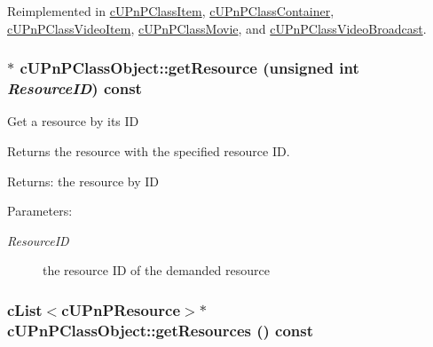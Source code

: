 Reimplemented in \hyperlink{classcUPnPClassItem_add0c9d378036e270e6f99d8d1409e3b}{cUPnPClassItem}, \hyperlink{classcUPnPClassContainer_d952c993314a9352d13f644bb95fbdc2}{cUPnPClassContainer}, \hyperlink{classcUPnPClassVideoItem_9dc397419b45535a3e6a676667b619a4}{cUPnPClassVideoItem}, \hyperlink{classcUPnPClassMovie_b62e6dac175090b82c47f955e29c146c}{cUPnPClassMovie}, and \hyperlink{classcUPnPClassVideoBroadcast_192f6a04c87fe8d56f99c71337cf0f68}{cUPnPClassVideoBroadcast}.\hypertarget{classcUPnPClassObject_7bce9528b984a9f943d9a1892bb592ad}{
\subsubsection[{getResource}]{$\ast$ cUPnPClassObject::getResource (unsigned int {\em ResourceID}) const}}
\label{classcUPnPClassObject_7bce9528b984a9f943d9a1892bb592ad}


Get a resource by its ID

Returns the resource with the specified resource ID.

\begin{Desc}
\item[Returns:]the resource by ID \end{Desc}
\begin{Desc}
\item[Parameters:]
\begin{description}
\item[{\em ResourceID}]the resource ID of the demanded resource \end{description}
\end{Desc}
\hypertarget{classcUPnPClassObject_24136f55324f724bfe7129eb424f4597}{
\subsubsection[{getResources}]{\setlength{\rightskip}{0pt plus 5cm}cList$<${\bf cUPnPResource}$>$$\ast$ cUPnPClassObject::getResources () const}}
\label{classcUPnPClassObject_24136f55324f724bfe7129eb424f4597}


